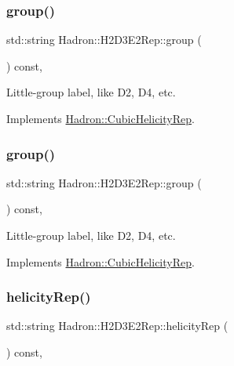 \subsubsection{\texorpdfstring{group()}{group()}\hspace{0.1cm}{\footnotesize\ttfamily [2/3]}}
{\footnotesize\ttfamily std\+::string Hadron\+::\+H2\+D3\+E2\+Rep\+::group (\begin{DoxyParamCaption}{ }\end{DoxyParamCaption}) const\hspace{0.3cm}{\ttfamily [inline]}, {\ttfamily [virtual]}}

Little-\/group label, like D2, D4, etc. 

Implements \mbox{\hyperlink{structHadron_1_1CubicHelicityRep_a101a7d76cd8ccdad0f272db44b766113}{Hadron\+::\+Cubic\+Helicity\+Rep}}.

\mbox{\label{structHadron_1_1H2D3E2Rep_a3a6d6bb478ae6e65c1d31ad244ab4d20}} 
\subsubsection{\texorpdfstring{group()}{group()}\hspace{0.1cm}{\footnotesize\ttfamily [3/3]}}
{\footnotesize\ttfamily std\+::string Hadron\+::\+H2\+D3\+E2\+Rep\+::group (\begin{DoxyParamCaption}{ }\end{DoxyParamCaption}) const\hspace{0.3cm}{\ttfamily [inline]}, {\ttfamily [virtual]}}

Little-\/group label, like D2, D4, etc. 

Implements \mbox{\hyperlink{structHadron_1_1CubicHelicityRep_a101a7d76cd8ccdad0f272db44b766113}{Hadron\+::\+Cubic\+Helicity\+Rep}}.

\mbox{\label{structHadron_1_1H2D3E2Rep_af42edde155e8d26e4f67fa592d7023d0}} 
\subsubsection{\texorpdfstring{helicityRep()}{helicityRep()}\hspace{0.1cm}{\footnotesize\ttfamily [1/2]}}
{\footnotesize\ttfamily std\+::string Hadron\+::\+H2\+D3\+E2\+Rep\+::helicity\+Rep (\begin{DoxyParamCaption}{ }\end{DoxyParamCaption}) const\hspace{0.3cm}{\ttfamily [inline]}, {\ttfamily [virtual]}}

